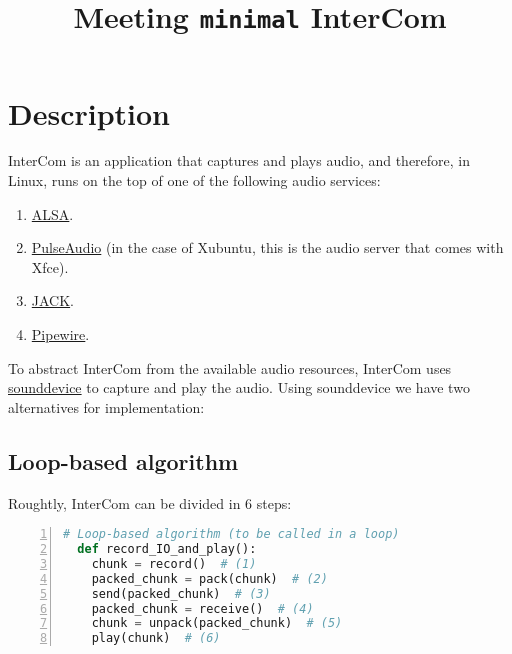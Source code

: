 
\title{Meeting \texttt{minimal} InterCom}

\maketitle

\section{Description}

InterCom is an application that captures and plays audio, and therefore, in Linux, runs on the top of one of the following audio services:
\begin{enumerate}
\item \href{https://vicente-gonzalez-ruiz.github.io/ALSA/}{ALSA}.
\item
  \href{https://vicente-gonzalez-ruiz.github.io/PulseAudio/}{PulseAudio}
  (in the case of Xubuntu, this is the audio server that comes with
  Xfce).
\item \href{https://vicente-gonzalez-ruiz.github.io/JACK/}{JACK}.
\item \href{https://pipewire.org/}{Pipewire}.
\end{enumerate}

To abstract InterCom from the available audio resources, InterCom uses
\href{https://vicente-gonzalez-ruiz.github.io/intro_to_sounddevice/}{sounddevice}
to capture and play the audio. Using sounddevice we have two
alternatives for implementation:

\subsection{Loop-based algorithm}

Roughtly, InterCom can be divided in 6 steps:

\begin{lstlisting}[language=Python,numbers=left]
  # Loop-based algorithm (to be called in a loop)
  def record_IO_and_play():
    chunk = record()  # (1)
    packed_chunk = pack(chunk)  # (2)
    send(packed_chunk)  # (3)
    packed_chunk = receive()  # (4)
    chunk = unpack(packed_chunk)  # (5)
    play(chunk)  # (6)
\end{lstlisting}


